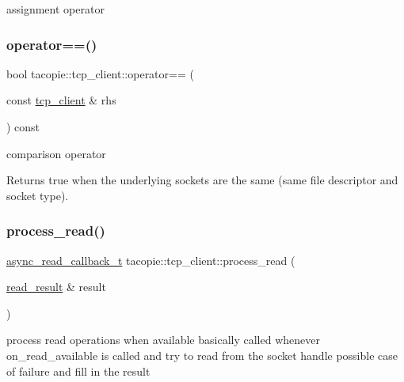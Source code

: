 assignment operator 

\mbox{\label{classtacopie_1_1tcp__client_af7a1796c04efd00542349ecab692e073}} 
\subsubsection{\texorpdfstring{operator==()}{operator==()}}
{\footnotesize\ttfamily bool tacopie\+::tcp\+\_\+client\+::operator== (\begin{DoxyParamCaption}\item[{const \hyperlink{classtacopie_1_1tcp__client}{tcp\+\_\+client} \&}]{rhs }\end{DoxyParamCaption}) const}

comparison operator

\begin{DoxyReturn}{Returns}
true when the underlying sockets are the same (same file descriptor and socket type). 
\end{DoxyReturn}
\mbox{\label{classtacopie_1_1tcp__client_a40308b6a1642a79a35a2b2d9c9b9a3f7}} 
\subsubsection{\texorpdfstring{process\+\_\+read()}{process\_read()}}
{\footnotesize\ttfamily \hyperlink{classtacopie_1_1tcp__client_acdf9dea8bac6c56f7b04ce38b9432322}{async\+\_\+read\+\_\+callback\+\_\+t} tacopie\+::tcp\+\_\+client\+::process\+\_\+read (\begin{DoxyParamCaption}\item[{\hyperlink{structtacopie_1_1tcp__client_1_1read__result}{read\+\_\+result} \&}]{result }\end{DoxyParamCaption})\hspace{0.3cm}{\ttfamily [private]}}

process read operations when available basically called whenever on\+\_\+read\+\_\+available is called and try to read from the socket handle possible case of failure and fill in the result


